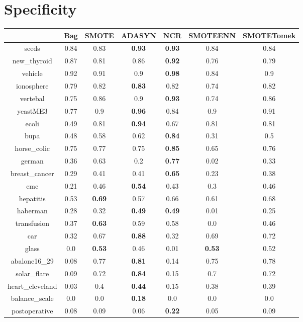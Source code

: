 \documentclass{article}%
\begin{document}
\section*{Specificity}%
\begin{tabular}{c|cccccc}%
&Bag&SMOTE&ADASYN&NCR&SMOTEENN&SMOTETomek\\%
\hline%
seeds&0.84&0.83&\textbf{0.93}&\textbf{0.93}&0.84&0.84\\%
new\_thyroid&0.87&0.81&0.86&\textbf{0.92}&0.76&0.79\\%
vehicle&0.92&0.91&0.9&\textbf{0.98}&0.84&0.9\\%
ionosphere&0.79&0.82&\textbf{0.83}&0.82&0.74&0.82\\%
vertebal&0.75&0.86&0.9&\textbf{0.93}&0.74&0.86\\%
yeastME3&0.77&0.9&\textbf{0.96}&0.84&0.9&0.91\\%
ecoli&0.49&0.81&\textbf{0.94}&0.67&0.81&0.81\\%
bupa&0.48&0.58&0.62&\textbf{0.84}&0.31&0.5\\%
horse\_colic&0.75&0.77&0.75&\textbf{0.85}&0.65&0.76\\%
german&0.36&0.63&0.2&\textbf{0.77}&0.02&0.33\\%
breast\_cancer&0.29&0.41&0.41&\textbf{0.65}&0.23&0.38\\%
cmc&0.21&0.46&\textbf{0.54}&0.43&0.3&0.46\\%
hepatitis&0.53&\textbf{0.69}&0.57&0.66&0.61&0.68\\%
haberman&0.28&0.32&\textbf{0.49}&\textbf{0.49}&0.01&0.25\\%
transfusion&0.37&\textbf{0.63}&0.59&0.58&0.0&0.46\\%
car&0.32&0.67&\textbf{0.88}&0.32&0.69&0.72\\%
glass&0.0&\textbf{0.53}&0.46&0.01&\textbf{0.53}&0.52\\%
abalone16\_29&0.08&0.77&\textbf{0.81}&0.14&0.75&0.78\\%
solar\_flare&0.09&0.72&\textbf{0.84}&0.15&0.7&0.72\\%
heart\_cleveland&0.03&0.4&\textbf{0.44}&0.15&0.38&0.39\\%
balance\_scale&0.0&0.0&\textbf{0.18}&0.0&0.0&0.0\\%
postoperative&0.08&0.09&0.06&\textbf{0.22}&0.05&0.09\\%
\end{tabular}

%
\end{document}

